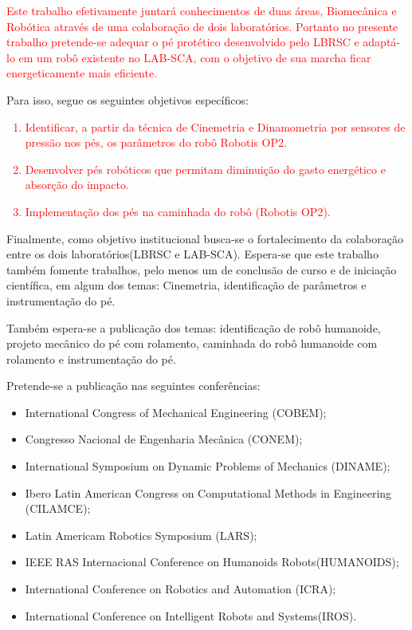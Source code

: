 \textcolor{red}{Este  trabalho efetivamente juntará conhecimentos de duas áreas, Biomecânica e Robótica através de uma colaboração de dois laboratórios. Portanto no presente trabalho pretende-se adequar o pé protético desenvolvido pelo LBRSC e adaptá-lo em um robô existente no LAB-SCA, com o objetivo de sua marcha ficar energeticamente mais eficiente. }

Para isso, segue os  seguintes objetivos específicos:
\textcolor{red}{
\begin{enumerate}
\item 	Identificar, a partir da técnica de Cinemetria e Dinamometria por sensores de pressão nos pés, os parâmetros do robô Robotis OP2.
\item	Desenvolver pés robóticos que permitam diminuição do gasto energético e absorção do impacto.
\item	Implementação dos pés  na caminhada do robô (Robotis OP2).
 \end{enumerate}}
Finalmente, como objetivo institucional busca-se o fortalecimento da colaboração entre os dois laboratórios(LBRSC e LAB-SCA). Espera-se que este trabalho também fomente trabalhos, pelo menos um de conclusão de curso e de iniciação científica, em algum dos temas: Cinemetria, identificação de parâmetros e instrumentação do pé. 

Também espera-se a publicação dos temas: identificação de robô humanoide, projeto mecânico do pé com rolamento, caminhada do robô humanoide com rolamento e instrumentação do pé. 

Pretende-se a publicação nas seguintes conferências:
\begin{itemize}
   \item International Congress of Mechanical Engineering (COBEM);
   \item Congresso Nacional de Engenharia Mecânica (CONEM);

\item International Symposium on Dynamic Problems of Mechanics (DINAME);

\item Ibero Latin American Congress on Computational Methods in Engineering (CILAMCE);

\item Latin Americam Robotics Symposium (LARS);

\item IEEE RAS Internacional Conference on Humanoids Robots(HUMANOIDS);

\item International Conference on Robotics and Automation (ICRA);

\item International Conference on Intelligent Robots and Systems(IROS).
 \end{itemize}

